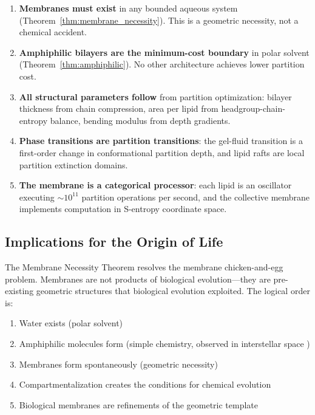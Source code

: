 \documentclass[twocolumn,10pt]{article}
\theoremstyle{remark}
\begin{document}
\begin{enumerate}
    \item \textbf{Membranes must exist} in any bounded aqueous system (Theorem~\ref{thm:membrane_necessity}). This is a geometric necessity, not a chemical accident.

    \item \textbf{Amphiphilic bilayers are the minimum-cost boundary} in polar solvent (Theorem~\ref{thm:amphiphilic}). No other architecture achieves lower partition cost.

    \item \textbf{All structural parameters follow} from partition optimization: bilayer thickness from chain compression, area per lipid from headgroup-chain-entropy balance, bending modulus from depth gradients.

    \item \textbf{Phase transitions are partition transitions}: the gel-fluid transition is a first-order change in conformational partition depth, and lipid rafts are local partition extinction domains.

    \item \textbf{The membrane is a categorical processor}: each lipid is an oscillator executing $\sim 10^{11}$ partition operations per second, and the collective membrane implements computation in S-entropy coordinate space.
\end{enumerate}

\subsection{Implications for the Origin of Life}

The Membrane Necessity Theorem resolves the membrane chicken-and-egg problem. Membranes are not products of biological evolution---they are pre-existing geometric structures that biological evolution exploited. The logical order is:

\begin{enumerate}
    \item Water exists (polar solvent)
    \item Amphiphilic molecules form (simple chemistry, observed in interstellar space \cite{dworkin2001})
    \item Membranes form spontaneously (geometric necessity)
    \item Compartmentalization creates the conditions for chemical evolution \cite{szostak2001}
    \item Biological membranes are refinements of the geometric template
\end{enumerate}
\end{document}
